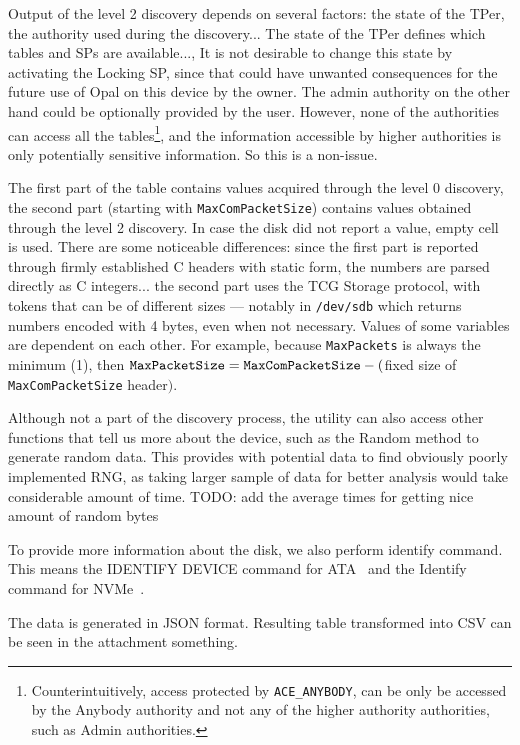 Output of the level 2 discovery depends on several factors: the state of the TPer, the authority used during the discovery...
The state of the TPer defines which tables and SPs are available..., It is not desirable to change this state by activating the Locking SP, since that could have unwanted consequences for the future use of Opal on this device by the owner.
The admin authority on the other hand could be optionally provided by the user. However, none of the authorities can access all the tables\footnote{Counterintuitively, access protected by \texttt{ACE\_ANYBODY}, can be only be accessed by the Anybody authority and not any of the higher authority authorities, such as Admin authorities.}, and the information accessible by higher authorities is only potentially sensitive information. So this is a non-issue.

The first part of the table contains values acquired through the level 0 discovery, the second part (starting with \verb|MaxComPacketSize|) contains values obtained through the level 2 discovery. In case the disk did not report a value, empty cell is used.
There are some noticeable differences: since the first part is reported through firmly established C headers with static form, the numbers are parsed directly as C integers... the second part uses the TCG Storage protocol, with tokens that can be of different sizes --- notably in \verb|/dev/sdb| which returns numbers encoded with 4 bytes, even when not necessary.
Values of some variables are dependent on each other. For example, because \verb|MaxPackets| is always the minimum (1), then $\verb|MaxPacketSize| = \verb|MaxComPacketSize| - ($fixed size of \verb|MaxComPacketSize| header$)$.

Although not a part of the discovery process, the utility can also access other functions that tell us more about the device, such as the Random method to generate random data. This provides with potential data to find obviously poorly implemented RNG, as taking larger sample of data for better analysis would take considerable amount of time. TODO: add the average times for getting nice amount of random bytes

To provide more information about the disk, we also perform identify command. This means the IDENTIFY DEVICE command for ATA~\cite{acs-3} and the Identify command for NVMe~\cite{nvme-express-base-specification}.

The data is generated in JSON format. Resulting table transformed into CSV can be seen in the attachment something.

